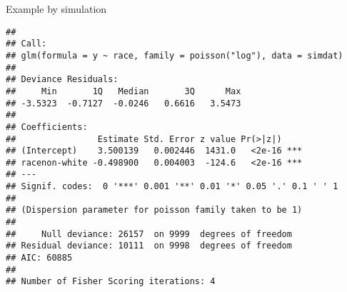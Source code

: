 \documentclass[ignorenonframetext,]{beamer}
\newenvironment{Shaded}{\begin{snugshade}}{\end{snugshade}}
\newcommand{\KeywordTok}[1]{\textcolor[rgb]{0.13,0.29,0.53}{\textbf{#1}}}
\newcommand{\DataTypeTok}[1]{\textcolor[rgb]{0.13,0.29,0.53}{#1}}
\newcommand{\DecValTok}[1]{\textcolor[rgb]{0.00,0.00,0.81}{#1}}
\newcommand{\FloatTok}[1]{\textcolor[rgb]{0.00,0.00,0.81}{#1}}
\newcommand{\StringTok}[1]{\textcolor[rgb]{0.31,0.60,0.02}{#1}}
\newcommand{\OtherTok}[1]{\textcolor[rgb]{0.56,0.35,0.01}{#1}}
\newcommand{\OperatorTok}[1]{\textcolor[rgb]{0.81,0.36,0.00}{\textbf{#1}}}
\newcommand{\NormalTok}[1]{#1}
\begin{document}
\begin{frame}[fragile]{Example by simulation}

\tiny

\begin{Shaded}
\end{Shaded}

\begin{verbatim}
## 
## Call:
## glm(formula = y ~ race, family = poisson("log"), data = simdat)
## 
## Deviance Residuals: 
##     Min       1Q   Median       3Q      Max  
## -3.5323  -0.7127  -0.0246   0.6616   3.5473  
## 
## Coefficients:
##                Estimate Std. Error z value Pr(>|z|)    
## (Intercept)    3.500139   0.002446  1431.0   <2e-16 ***
## racenon-white -0.498900   0.004003  -124.6   <2e-16 ***
## ---
## Signif. codes:  0 '***' 0.001 '**' 0.01 '*' 0.05 '.' 0.1 ' ' 1
## 
## (Dispersion parameter for poisson family taken to be 1)
## 
##     Null deviance: 26157  on 9999  degrees of freedom
## Residual deviance: 10111  on 9998  degrees of freedom
## AIC: 60885
## 
## Number of Fisher Scoring iterations: 4
\end{verbatim}

\end{frame}
\end{document}

